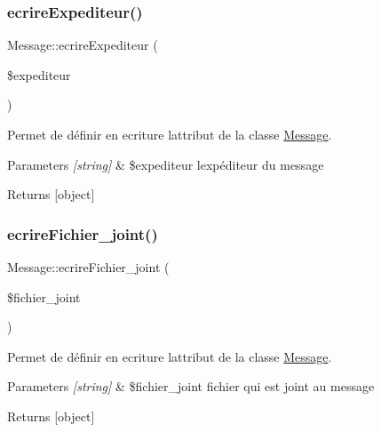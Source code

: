 \subsubsection{\texorpdfstring{ecrire\+Expediteur()}{ecrireExpediteur()}}
{\footnotesize\ttfamily Message\+::ecrire\+Expediteur (\begin{DoxyParamCaption}\item[{}]{\$expediteur }\end{DoxyParamCaption})}



Permet de définir en ecriture l\textquotesingle{}attribut de la classe \hyperlink{class_message}{Message}. 


\begin{DoxyParams}{Parameters}
{\em \mbox{[}string\mbox{]}} & \$expediteur l\textquotesingle{}expéditeur du message \\
\hline
\end{DoxyParams}
\begin{DoxyReturn}{Returns}
\mbox{[}object\mbox{]} 
\end{DoxyReturn}
\mbox{\label{class_message_afe984505a2b8324fcae8f1d3b7c6bf77}} 
\subsubsection{\texorpdfstring{ecrire\+Fichier\+\_\+joint()}{ecrireFichier\_joint()}}
{\footnotesize\ttfamily Message\+::ecrire\+Fichier\+\_\+joint (\begin{DoxyParamCaption}\item[{}]{\$fichier\+\_\+joint }\end{DoxyParamCaption})}



Permet de définir en ecriture l\textquotesingle{}attribut de la classe \hyperlink{class_message}{Message}. 


\begin{DoxyParams}{Parameters}
{\em \mbox{[}string\mbox{]}} & \$fichier\+\_\+joint fichier qui est joint au message \\
\hline
\end{DoxyParams}
\begin{DoxyReturn}{Returns}
\mbox{[}object\mbox{]} 
\end{DoxyReturn}
\mbox{\label{class_message_aa1e4592b7600bff512985dbfaa48cbd2}} 
